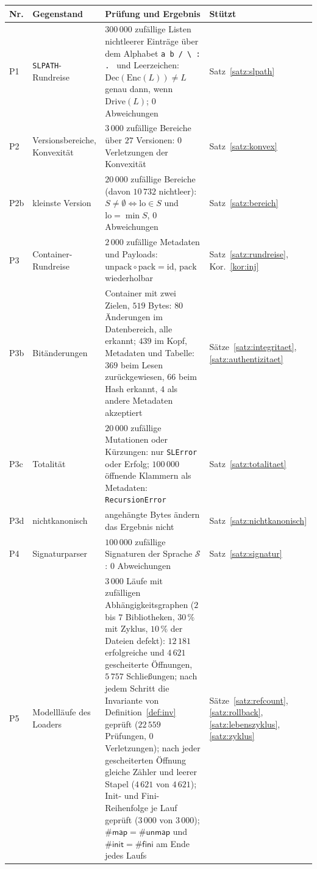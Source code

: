 \documentclass[a4paper,12pt,twoside]{report}
\DeclareRobustCommand{\_}{\ifmmode\mbox{\textunderscore}\else\textunderscore\allowbreak{}\fi}
\theoremstyle{definition}
\begin{document}
\begin{table}[!ht]
	\centering
	\small
	\begin{tabularx}{\textwidth}{@{}L{1.0cm}L{3.1cm}YL{2.3cm}@{}}
		\toprule
		Nr. & Gegenstand & Prüfung und Ergebnis & Stützt \\
		\midrule
		P1 & \texttt{SL\_PATH}-Rundreise & $300\,000$ zufällige Listen nichtleerer Einträge über dem Alphabet \texttt{a b / \textbackslash\ : . } und Leerzeichen: $\mathrm{Dec}(\mathrm{Enc}(L))\ne L$ genau dann, wenn $\mathrm{Drive}(L)$; $0$ Abweichungen & Satz~\ref{satz:slpath} \\[0.3em]
		P2 & Versionsbereiche, Konvexität & $3\,000$ zufällige Bereiche über $27$ Versionen: $0$ Verletzungen der Konvexität & Satz~\ref{satz:konvex} \\[0.3em]
		P2b & kleinste Version & $20\,000$ zufällige Bereiche (davon $10\,732$ nichtleer): $S\ne\emptyset\iff\mathrm{lo}\in S$ und $\mathrm{lo}=\min S$, $0$ Abweichungen & Satz~\ref{satz:bereich} \\[0.3em]
		P3 & Container-Rundreise & $2\,000$ zufällige Metadaten und Payloads: $\mathrm{unpack}\circ\mathrm{pack}=\mathrm{id}$, $\mathrm{pack}$ wiederholbar & Satz~\ref{satz:rundreise}, Kor.~\ref{kor:inj} \\[0.3em]
		P3b & Bitänderungen & Container mit zwei Zielen, $519$ Bytes: $80$ Änderungen im Datenbereich, alle erkannt; $439$ im Kopf, Metadaten und Tabelle: $369$ beim Lesen zurückgewiesen, $66$ beim Hash erkannt, $4$ als andere Metadaten akzeptiert & Sätze~\ref{satz:integritaet}, \ref{satz:authentizitaet} \\[0.3em]
		P3c & Totalität & $20\,000$ zufällige Mutationen oder Kürzungen: nur \texttt{SLError} oder Erfolg; $100\,000$ öffnende Klammern als Metadaten: \texttt{RecursionError} & Satz~\ref{satz:totalitaet} \\[0.3em]
		P3d & nichtkanonisch & angehängte Bytes ändern das Ergebnis nicht & Satz~\ref{satz:nichtkanonisch} \\[0.3em]
		P4 & Signaturparser & $100\,000$ zufällige Signaturen der Sprache $\mathcal S$: $0$ Abweichungen & Satz~\ref{satz:signatur} \\[0.3em]
		P5 & Modellläufe des Loaders & $3\,000$ Läufe mit zufälligen Abhängigkeitsgraphen ($2$ bis $7$ Bibliotheken, $30\,\%$ mit Zyklus, $10\,\%$ der Dateien defekt): $12\,181$ erfolgreiche und $4\,621$ gescheiterte Öffnungen, $5\,757$ Schließungen; nach jedem Schritt die Invariante von Definition~\ref{def:inv} geprüft ($22\,559$ Prüfungen, $0$ Verletzungen); nach jeder gescheiterten Öffnung gleiche Zähler und leerer Stapel ($4\,621$ von $4\,621$); Init- und Fini-Reihenfolge je Lauf geprüft ($3\,000$ von $3\,000$); $\#\mathsf{map}=\#\mathsf{unmap}$ und $\#\mathsf{init}=\#\mathsf{fini}$ am Ende jedes Laufs & Sätze~\ref{satz:refcount}, \ref{satz:rollback}, \ref{satz:lebenszyklus}, \ref{satz:zyklus} \\[0.3em]

\end{tabularx}
\end{table}
\end{document}

